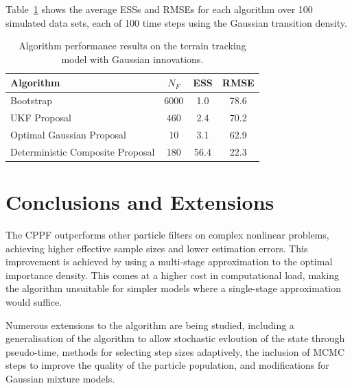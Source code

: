 \documentclass[conference]{IEEEtran}
\begin{document}
Table~\ref{tab:drone_results_gaussian} shows the average ESSs and RMSEs for each algorithm over 100 simulated data sets, each of 100 time steps using the Gaussian transition density.
%
\begin{table}
\renewcommand{\arraystretch}{1.3}
\centering
\caption{Algorithm performance results on the terrain tracking model with Gaussian innovations.}
\begin{tabular}{l||c|c|c}
Algorithm                                & $N_F$ & ESS  & RMSE \\
\hline
Bootstrap                                &  6000 &  1.0 & 78.6 \\
UKF Proposal                             &   460 &  2.4 & 70.2 \\
Optimal Gaussian Proposal                &    10 &  3.1 & 62.9 \\
Deterministic Composite Proposal         &   180 & 56.4 & 22.3 \\
\end{tabular}
\label{tab:drone_results_gaussian}
\end{table}



\section{Conclusions and Extensions}

The CPPF outperforms other particle filters on complex nonlinear problems, achieving higher effective sample sizes and lower estimation errors. This improvement is achieved by using a multi-stage approximation to the optimal importance density. This comes at a higher cost in computational load, making the algorithm unsuitable for simpler models where a single-stage approximation would suffice.

Numerous extensions to the algorithm are being studied, including a generalisation of the algorithm to allow stochastic evloution of the state through pseudo-time, methods for selecting step sizes adaptively, the inclusion of MCMC steps to improve the quality of the particle population, and modifications for Gaussian mixture models.
\end{document}
